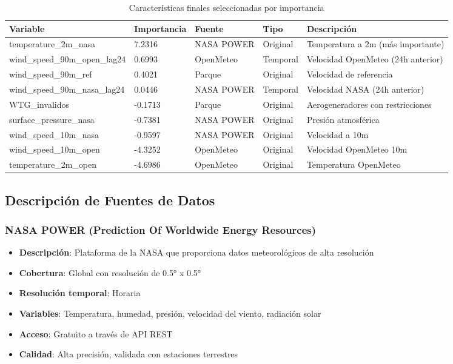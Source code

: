 \documentclass[conference]{IEEEtran}
\begin{document}
	\begin{table}[htbp]
		\centering
		\caption{Características finales seleccionadas por importancia}
		\begin{tabular}{|p{2.5cm}|p{1.2cm}|p{1.4cm}|p{1.2cm}|p{3.5cm}|}
			\hline
			\textbf{Variable} & \textbf{Importancia} & \textbf{Fuente} & \textbf{Tipo} & \textbf{Descripción} \\
			\hline
			temperature\_2m\_nasa & 7.2316 & NASA POWER & Original & Temperatura a 2m (más importante) \\
			\hline
			wind\_speed\_90m\_open\_lag24 & 0.6993 & OpenMeteo & Temporal & Velocidad OpenMeteo (24h anterior) \\
			\hline
			wind\_speed\_90m\_ref & 0.4021 & Parque & Original & Velocidad de referencia \\
			\hline
			wind\_speed\_90m\_nasa\_lag24 & 0.0446 & NASA POWER & Temporal & Velocidad NASA (24h anterior) \\
			\hline
			WTG\_invalidos & -0.1713 & Parque & Original & Aerogeneradores con restricciones \\
			\hline
			surface\_pressure\_nasa & -0.7381 & NASA POWER & Original & Presión atmosférica \\
			\hline
			wind\_speed\_10m\_nasa & -0.9597 & NASA POWER & Original & Velocidad a 10m \\
			\hline
			wind\_speed\_10m\_open & -4.3252 & OpenMeteo & Original & Velocidad OpenMeteo 10m \\
			\hline
			temperature\_2m\_open & -4.6986 & OpenMeteo & Original & Temperatura OpenMeteo \\
			\hline
		\end{tabular}
		\label{tab:selected_features}
	\end{table}
	
	\subsection{Descripción de Fuentes de Datos}
	
	\subsubsection{NASA POWER (Prediction Of Worldwide Energy Resources)}
	\begin{itemize}[leftmargin=*]
		\item \textbf{Descripción}: Plataforma de la NASA que proporciona datos meteorológicos de alta resolución
		\item \textbf{Cobertura}: Global con resolución de 0.5° x 0.5°
		\item \textbf{Resolución temporal}: Horaria
		\item \textbf{Variables}: Temperatura, humedad, presión, velocidad del viento, radiación solar
		\item \textbf{Acceso}: Gratuito a través de API REST
		\item \textbf{Calidad}: Alta precisión, validada con estaciones terrestres
	\end{itemize}
	
\end{document}

